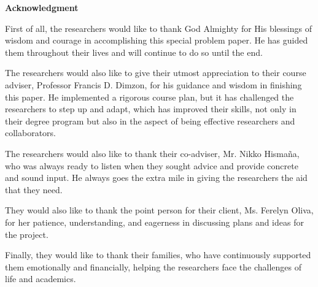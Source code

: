 \begin{center}
	\textbf{Acknowledgment}
\end{center}

First of all, the researchers would like to thank God Almighty for His blessings of wisdom and courage in accomplishing this special problem paper. He has guided them throughout their lives and will continue to do so until the end.

The researchers would also like to give their utmost appreciation to their course adviser, Professor Francis D. Dimzon, for his guidance and wisdom in finishing this paper. He implemented a rigorous course plan, but it has challenged the researchers to step up and adapt, which has improved their skills, not only in their degree program but also in the aspect of being effective researchers and collaborators.

The researchers would also like to thank their co-adviser, Mr. Nikko Hismaña, who was always ready to listen when they sought advice and provide concrete and sound input. He always goes the extra mile in giving the researchers the aid that they need.

They would also like to thank the point person for their client, Ms. Ferelyn Oliva, for her patience, understanding, and eagerness in discussing plans and ideas for the project.

Finally, they would like to thank their families, who have continuously supported them emotionally and financially, helping the researchers face the challenges of life and academics.
